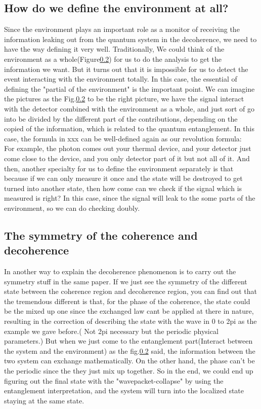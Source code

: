 \documentclass[final,1p,12pt]{elsarticle}
\begin{document}
\subsection{How do we define the environment at all?}
Since the environment plays an important role as a monitor of receiving the information leaking out from the quantum system in the decoherence, we need to have the way defining it very well. Traditionally, We could think of the environment as a whole(Figure\ref{}) for us to do the analysis to get the information we want. But it turns out that it is impossible for us to detect the event interacting with the environment totally. In this case, the essential of defining the "partial of the environment" is the important point. We can imagine the pictures as the Fig.\ref{} to be the right picture, we have the signal interact with the detector combined with the environment as a whole, and just sort of go into be divided by the different part of the contributions, depending on the copied of the information, which is related to the quantum entanglement. In this case, the formula in xxx can be well-defined again as our revolution formula: \\ 

For example, the photon comes out your thermal device, and your detector just come close to the device, and you only detector part of it but not all of it. And then, another specialty for us to define the environment separately is that because if we can only measure it once and the state will be destroyed to get turned into another state, then how come can we check if the signal which is measured is right? In this case, since the signal will leak to the some parts of the environment, so we can do checking doubly.\\

\subsection{The symmetry of the coherence and decoherence}
In another way to explain the decoherence phenomenon is to carry out the symmetry stuff in the same paper. If we just see the symmetry of the different state between the coherence region and decoherence region, you can find out that the tremendous different is that, for the phase of the coherence, the state could be the mixed up one since the exchanged law cant be applied at there in nature, resulting in the correction of describing the state with the wave in 0 to 2pi as the example we gave before.( Not 2pi necessary but the periodic physical parameters.) But when we just come to the entanglement part(Interact between the system and the environment) as the fig.\ref{} said, the information between the two system can exchange mathematically. On the other hand, the phase can't be the periodic since the they just mix up together. So in the end, we could end up figuring out the final state with the "wavepacket-collapse" by using the entanglement interpretation, and the system will turn into the localized state staying at the same state. \\
\end{document}
